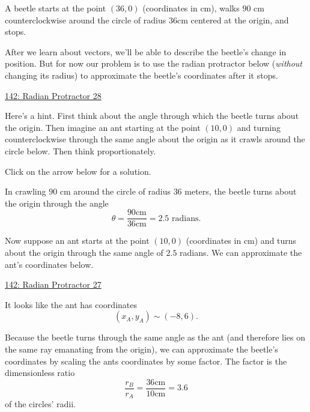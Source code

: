 \documentclass{ximera}
\begin{document}
\begin{question} \label{QBeerteee}
A beetle starts at the point $(36,0)$ (coordinates in cm), walks $90$ cm counterclockwise around the circle of radius $36$cm centered at the origin, and stops. 

After we learn about vectors, we'll be able to describe the beetle's change in position. But for now our problem is to use the radian protractor below (\emph{without} changing its radius) to approximate the beetle's coordinates after it stops.

\begin{onlineOnly}
    \begin{center}
\end{center}

\href{https://www.desmos.com/calculator/jqc8dd0iws}{142: Radian Protractor 28}

\end{onlineOnly}

\begin{hint}
Here's a hint. First think about the angle through which the beetle turns about the origin. Then imagine an ant starting at the point $(10,0)$ and turning counterclockwise through the same angle about the origin  as it crawls around the circle below. Then think proportionately.
\end{hint}

Click on the arrow below for a solution.
\begin{expandable}
In crawling $90$ cm around the circle of radius $36$ meters, the beetle turns about the origin through the angle
\[
  \theta = \frac{90 \text{cm}}{36\text{cm}} = 2.5 \text{ radians}.
\]

Now suppose an ant starts at the point $(10,0)$ (coordinates in cm) and turns about the origin through the same angle of $2.5$ radians. We can approximate the ant's coordinates below.

\begin{onlineOnly}
    \begin{center}
\end{center}

\href{https://www.desmos.com/calculator/qgzfms6w0k}{142: Radian Protractor 27}

\end{onlineOnly}

It looks like the ant has coordinates
\[
 (x_A , y_A) \sim (-8,6).
\]

Because the beetle turns through the same angle as the ant (and therefore lies on the same ray emanating from the origin), we can approximate the beetle's coordinates by scaling the ants coordinates by some factor. The factor is the dimensionless ratio
\[
   \frac{r_B}{r_A} = \frac{36 \text{cm}}{10\text{cm}} = 3.6
\]
of the circles' radii.


\end{expandable}
\end{question}
\end{document}
